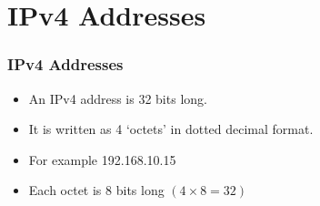 \documentclass[pdflatex,compress]{beamer}
\begin{document}
\section{IPv4 Addresses}

\begin{frame}
	\frametitle{IPv4 Addresses}
	\begin{itemize}
		\item An IPv4 address is 32 bits long.
		\item It is written as 4 ‘octets’ in dotted decimal format.
		\item For example 192.168.10.15
		\item Each octet is 8 bits long $ (4 \times 8 = 32) $
	\end{itemize}	
\end{frame}
\end{document}
